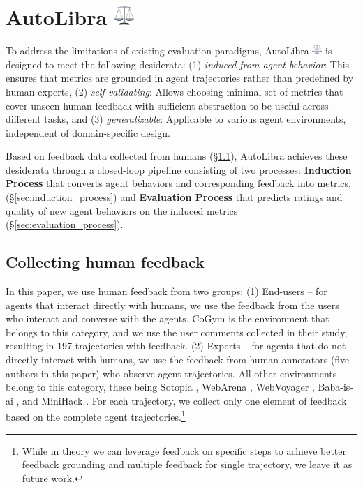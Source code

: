 \section{\texorpdfstring{AutoLibra
	  \includegraphics[height=1em]{figs/scale.png}}{AutoLibra}}

To address the limitations of existing evaluation paradigms, AutoLibra \protect
\includegraphics[height=1em]{figs/scale.png}
is designed to meet the following desiderata: (1) \emph{induced from agent
	behavior}: This ensures that metrics are grounded in agent trajectories rather than
predefined by human experts, (2) \emph{self-validating}: Allows choosing minimal
set of metrics that cover unseen human feedback with sufficient abstraction to
be useful across different tasks, and (3) \emph{generalizable}: Applicable to various
agent environments, independent of domain-specific design.

Based on feedback data collected from humans (\S\ref{sec:collecting-human-feedback}),
AutoLibra achieves these desiderata through a closed-loop pipeline consisting of
two processes: \textbf{Induction Process} that converts agent behaviors and
corresponding feedback into metrics, (\S\ref{sec:induction_process}) and \textbf{Evaluation
	Process} that predicts ratings and quality of new agent behaviors on the induced
metrics (\S\ref{sec:evaluation_process}).

\subsection{Collecting human feedback}
\label{sec:collecting-human-feedback} In this paper, we use human feedback from two
groups: (1) End-users -- for agents that interact directly with humans, we use
the feedback from the users who interact and converse with the agents. CoGym \citep{shao2024collaborative}
is the environment that belongs to this category, and we use the user comments collected
in their study, resulting in 197 trajectories with feedback. (2) Experts -- for
agents that do not directly interact with humans, we use the feedback from human
annotators (five authors in this paper) who observe agent trajectories. All
other environments belong to this category, these being Sotopia \citep{zhousotopia},
WebArena \citep{zhouwebarena}, WebVoyager \citep{he2024webvoyager}, Baba-is-ai \citep{cloos2024babaaibreakrules},
and MiniHack \citep{samvelyan2021minihackplanetsandboxopenended}. For each trajectory,
we collect only one element of feedback based on the complete
agent trajectories.\footnote{While in theory we can leverage feedback on
	specific steps to achieve better feedback grounding and multiple feedback for
	single trajectory, we leave it as future work.}

